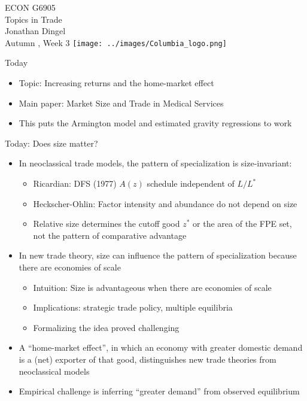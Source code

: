 \documentclass[11pt,notes=hide,aspectratio=169]{beamer}
\begin{document}
\begin{frame}[plain]
\begin{center}
\large
\textcolor{columbiadarkblue}{ECON G6905\\
Topics in Trade\\ 
Jonathan Dingel\\
Autumn \the\year, Week 3}
\vfill 
\texttt{[image: ../images/Columbia\_logo.png]}
\end{center}
\end{frame}
\begin{frame}{Today}
\begin{itemize}
	\item Topic: Increasing returns and the home-market effect
	\item Main paper: Market Size and Trade in Medical Services
	\item This puts the Armington model and estimated gravity regressions to work 
\end{itemize}
\end{frame}
\begin{frame}{Today: Does size matter?}
\linespread{1.1}
\begin{itemize}
	\item In neoclassical trade models, the pattern of specialization is size-invariant:
	\begin{itemize}
		\item Ricardian: DFS (1977) $A(z)$ schedule independent of $L/L^{*}$
		\item Heckscher-Ohlin: Factor intensity and abundance do not depend on size 
		\item Relative size determines the cutoff good $z^{*}$ or the area of the FPE set, not the pattern of comparative advantage
	\end{itemize}
	\item In new trade theory, size can influence the pattern of specialization because there are economies of scale
\begin{itemize}
	\item Intuition: Size is advantageous when there are economies of scale
	\item Implications: strategic trade policy, multiple equilibria
	\item Formalizing the idea proved challenging
\end{itemize}
	\item A ``home-market effect'', in which an economy with greater domestic demand is a (net) exporter of that good, distinguishes new trade theories from neoclassical models
	\item Empirical challenge is inferring ``greater demand'' from observed equilibrium
\end{itemize}
\end{frame}
\end{document}
